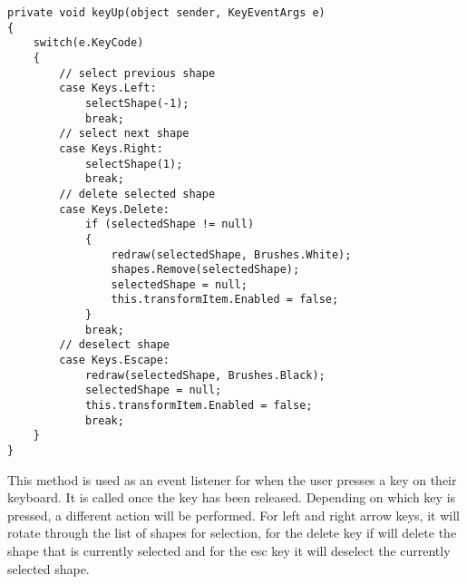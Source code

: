 \documentclass[8pt, openany]{extreport}
\begin{document}
\begin{lstlisting}
private void keyUp(object sender, KeyEventArgs e)
{
    switch(e.KeyCode)
    {
        // select previous shape
        case Keys.Left:
            selectShape(-1);
            break;
        // select next shape
        case Keys.Right:
            selectShape(1);
            break;
        // delete selected shape
        case Keys.Delete:
            if (selectedShape != null)
            {
                redraw(selectedShape, Brushes.White);
                shapes.Remove(selectedShape);
                selectedShape = null;
                this.transformItem.Enabled = false;
            }
            break;
        // deselect shape
        case Keys.Escape:
            redraw(selectedShape, Brushes.Black);
            selectedShape = null;
            this.transformItem.Enabled = false;
            break;
    }
}
\end{lstlisting}
This method is used as an event listener for when the user presses a key on their keyboard. It is called once the key has been released. Depending on which key is pressed, a different action will be performed. For left and right arrow keys, it will rotate through the list of shapes for selection, for the delete key if will delete the shape that is currently selected and for the esc key it will deselect the currently selected shape.
\end{document}
